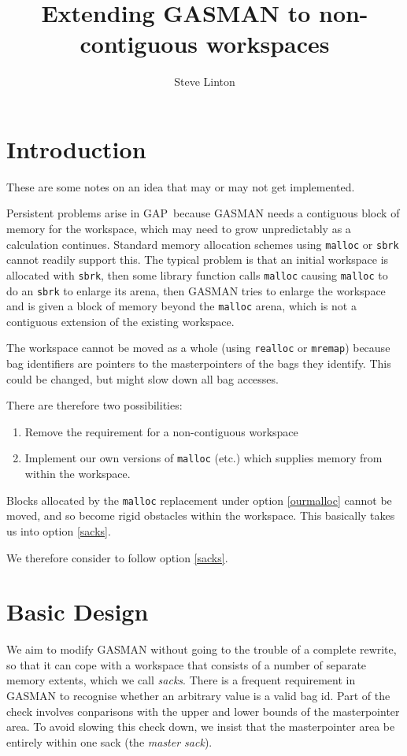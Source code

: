 \documentclass[12pt]{article}
\title{Extending GASMAN to non-contiguous workspaces}
\author{Steve Linton}
\newcommand{\GAP}{\textsf{GAP}}
\begin{document}
\maketitle
\section{Introduction}

These are some notes on an idea that may or may not get implemented.

Persistent problems arise in \GAP\ because GASMAN needs a contiguous
block of memory for the workspace, which may need to grow
unpredictably as a calculation continues. Standard memory allocation
schemes using \verb|malloc| or \verb|sbrk| cannot readily support
this.  The typical problem is that an initial workspace is allocated
with \verb|sbrk|, then some library function calls \verb|malloc|
causing \verb|malloc| to do an \verb|sbrk| to enlarge its arena, then
GASMAN tries to enlarge the workspace and is given a block of memory
beyond the \verb|malloc| arena, which is not a contiguous extension of 
the existing workspace.

The workspace cannot be moved as a whole (using \verb|realloc| or \verb|mremap|)
because bag identifiers are pointers to the masterpointers of the 
bags they identify. This could be changed, but might slow down all bag
accesses.

There are therefore two possibilities:
\begin{enumerate}
\item Remove the requirement for a non-contiguous workspace \label{sacks}
\item Implement our own versions of \verb|malloc| (etc.) which
supplies memory from within the workspace. \label{ourmalloc}
\end{enumerate}

Blocks allocated by the \verb|malloc| replacement under option
\ref{ourmalloc} cannot be moved, and so become rigid obstacles within
the workspace. This basically takes us into option \ref{sacks}.

We therefore consider to follow option \ref{sacks}.

\section{Basic Design}

We aim to modify GASMAN without going to the trouble of a complete
rewrite, so that it can cope with a workspace that consists of a
number of separate memory extents, which we call \emph{sacks}. There
is a frequent requirement in GASMAN to recognise whether an arbitrary
value is a valid bag id. Part of the check involves conparisons with
the upper and lower bounds of the masterpointer area. To avoid slowing 
this check down, we insist that the masterpointer area be entirely
within one sack (the \emph{master sack}).
\end{document}
